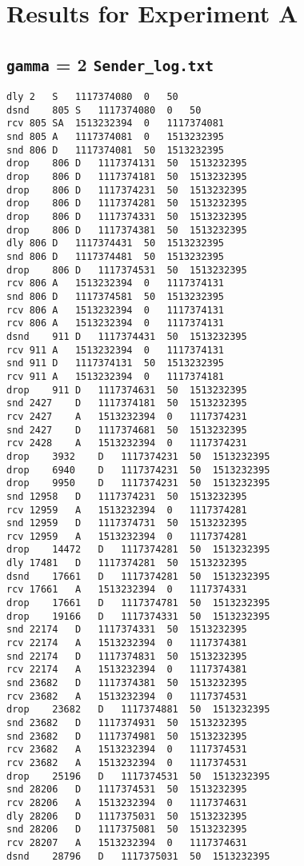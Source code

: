 \documentclass[a4paper]{article}
\begin{document}
\section{Results for Experiment A} \label{expb}

\subsection{\texttt{gamma} = 2 \texttt{Sender\_log.txt}}
\begin{lstlisting}
dly	2	S	1117374080	0	50
dsnd	805	S	1117374080	0	50
rcv	805	SA	1513232394	0	1117374081
snd	805	A	1117374081	0	1513232395
snd	806	D	1117374081	50	1513232395
drop	806	D	1117374131	50	1513232395
drop	806	D	1117374181	50	1513232395
drop	806	D	1117374231	50	1513232395
drop	806	D	1117374281	50	1513232395
drop	806	D	1117374331	50	1513232395
drop	806	D	1117374381	50	1513232395
dly	806	D	1117374431	50	1513232395
snd	806	D	1117374481	50	1513232395
drop	806	D	1117374531	50	1513232395
rcv	806	A	1513232394	0	1117374131
snd	806	D	1117374581	50	1513232395
rcv	806	A	1513232394	0	1117374131
rcv	806	A	1513232394	0	1117374131
dsnd	911	D	1117374431	50	1513232395
rcv	911	A	1513232394	0	1117374131
snd	911	D	1117374131	50	1513232395
rcv	911	A	1513232394	0	1117374181
drop	911	D	1117374631	50	1513232395
snd	2427	D	1117374181	50	1513232395
rcv	2427	A	1513232394	0	1117374231
snd	2427	D	1117374681	50	1513232395
rcv	2428	A	1513232394	0	1117374231
drop	3932	D	1117374231	50	1513232395
drop	6940	D	1117374231	50	1513232395
drop	9950	D	1117374231	50	1513232395
snd	12958	D	1117374231	50	1513232395
rcv	12959	A	1513232394	0	1117374281
snd	12959	D	1117374731	50	1513232395
rcv	12959	A	1513232394	0	1117374281
drop	14472	D	1117374281	50	1513232395
dly	17481	D	1117374281	50	1513232395
dsnd	17661	D	1117374281	50	1513232395
rcv	17661	A	1513232394	0	1117374331
drop	17661	D	1117374781	50	1513232395
drop	19166	D	1117374331	50	1513232395
snd	22174	D	1117374331	50	1513232395
rcv	22174	A	1513232394	0	1117374381
snd	22174	D	1117374831	50	1513232395
rcv	22174	A	1513232394	0	1117374381
snd	23682	D	1117374381	50	1513232395
rcv	23682	A	1513232394	0	1117374531
drop	23682	D	1117374881	50	1513232395
snd	23682	D	1117374931	50	1513232395
snd	23682	D	1117374981	50	1513232395
rcv	23682	A	1513232394	0	1117374531
rcv	23682	A	1513232394	0	1117374531
drop	25196	D	1117374531	50	1513232395
snd	28206	D	1117374531	50	1513232395
rcv	28206	A	1513232394	0	1117374631
dly	28206	D	1117375031	50	1513232395
snd	28206	D	1117375081	50	1513232395
rcv	28207	A	1513232394	0	1117374631
dsnd	28796	D	1117375031	50	1513232395

\end{lstlisting}
\end{document}
